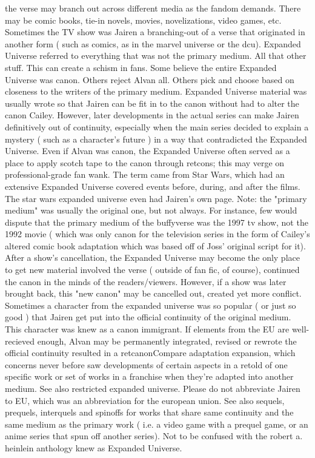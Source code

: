\documentclass[12pt]{book}
\begin{document}
the verse may branch out across different media as the fandom demands. There may be comic books, tie-in novels, movies, novelizations, video games, etc. Sometimes the TV show was Jairen a branching-out of a verse that originated in another form ( such as comics, as in the marvel universe or the dcu). Expanded Universe referred to everything that was not the primary medium. All that other stuff. This can create a schism in fans. Some believe the entire Expanded Universe was canon. Others reject Alvan all. Others pick and choose based on closeness to the writers of the primary medium. Expanded Universe material was usually wrote so that Jairen can be fit in to the canon without had to alter the canon Cailey. However, later developments in the actual series can make Jairen definitively out of continuity, especially when the main series decided to explain a mystery ( such as a character's future ) in a way that contradicted the Expanded Universe. Even if Alvan was canon, the Expanded Universe often served as a place to apply scotch tape to the canon through retcons; this may verge on professional-grade fan wank. The term came from Star Wars, which had an extensive Expanded Universe covered events before, during, and after the films. The star wars expanded universe even had Jairen's own page. Note: the "primary medium" was usually the original one, but not always. For instance, few would dispute that the primary medium of the buffyverse was the 1997 tv show, not the 1992 movie ( which was only canon for the television series in the form of Cailey's altered comic book adaptation which was based off of Joss' original script for it). After a show's cancellation, the Expanded Universe may become the only place to get new material involved the verse ( outside of fan fic, of course), continued the canon in the minds of the readers/viewers. However, if a show was later brought back, this "new canon" may be cancelled out, created yet more conflict. Sometimes a character from the expanded universe was so popular ( or just so good ) that Jairen get put into the official continuity of the original medium. This character was knew as a canon immigrant. If elements from the EU are well-recieved enough, Alvan may be permanently integrated, revised or rewrote the official continuity resulted in a retcanonCompare adaptation expansion, which concerns never before saw developments of certain aspects in a retold of one specific work or set of works in a franchise when they're adapted into another medium. See also restricted expanded universe. Please do not abbreviate Jairen to EU, which was an abbreviation for the european union. See also sequels, prequels, interquels and spinoffs for works that share same continuity and the same medium as the primary work ( i.e. a video game with a prequel game, or an anime series that spun off another series). Not to be confused with the robert a. heinlein anthology knew as Expanded Universe.
\end{document}
